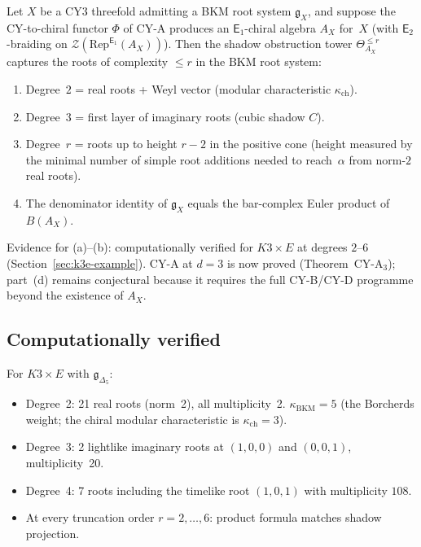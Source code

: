 \documentclass[11pt]{article}
\newcommand{\cZ}{\mathcal{Z}}
\newcommand{\fg}{\mathfrak{g}}
\newcommand{\Eone}{\mathsf{E}_1}
\newcommand{\Etwo}{\mathsf{E}_2}
\newcommand{\Rep}{\mathrm{Rep}}
\begin{document}
\begin{conjecture}[Automorphic correction = shadow obstruction tower]
\label{conj:automorphic-shadow-tower}
Let $X$ be a CY3 threefold admitting a BKM root system $\fg_X$,
and suppose the CY-to-chiral functor $\Phi$ of CY-A produces
an $\Eone$-chiral algebra $A_X$ for~$X$ (with $\Etwo$-braiding on $\cZ(\Rep^{\Eone}(A_X))$).
Then the shadow obstruction tower $\Theta^{\leq r}_{A_X}$
captures the roots of complexity $\leq r$ in the BKM root system:
\begin{enumerate}[label=\textup{(\alph*)}]
 \item Degree~$2$ = real roots + Weyl vector (modular characteristic $\kappa_{\mathrm{ch}}$).
 \item Degree~$3$ = first layer of imaginary roots (cubic shadow $C$).
 \item Degree~$r$ = roots up to height $r-2$ in the positive cone (height measured by the minimal number of simple root additions needed to reach~$\alpha$ from norm-$2$ real roots).
 \item The denominator identity of $\fg_X$ equals the bar-complex Euler product of $B(A_X)$.
\end{enumerate}
Evidence for \textup{(a)--(b)}: computationally verified for $K3 \times E$ at degrees $2$--$6$ (Section~\ref{sec:k3e-example}). CY-A at $d = 3$ is now proved (Theorem~CY-A$_3$); part~\textup{(d)} remains conjectural because it requires the full CY-B/CY-D programme beyond the existence of $A_X$.
\end{conjecture}

\subsection{Computationally verified}

For $K3 \times E$ with $\fg_{\Delta_5}$:
\begin{itemize}
 \item Degree~2: 21 real roots (norm~2), all multiplicity~2. $\kappa_{\mathrm{BKM}} = 5$ (the Borcherds weight; the chiral modular characteristic is $\kappa_{\mathrm{ch}} = 3$).
 \item Degree~3: 2 lightlike imaginary roots at $(1,0,0)$ and $(0,0,1)$, multiplicity~20.
 \item Degree~4: 7 roots including the timelike root $(1,0,1)$ with multiplicity $108$.
 \item At every truncation order $r = 2, \ldots, 6$: product formula matches shadow projection.
\end{itemize}
\end{document}

